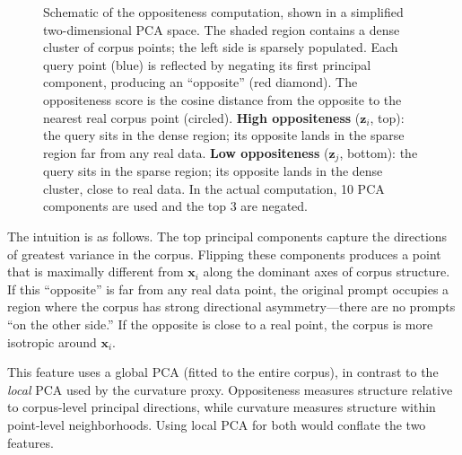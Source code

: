 \begin{figure}[ht]
\caption{Schematic of the oppositeness computation, shown in a simplified two-dimensional PCA space. The shaded region contains a dense cluster of corpus points; the left side is sparsely populated. Each query point (blue) is reflected by negating its first principal component, producing an ``opposite'' (red diamond). The oppositeness score is the cosine distance from the opposite to the nearest real corpus point (circled). \textbf{High oppositeness} ($\mathbf{z}_i$, top): the query sits in the dense region; its opposite lands in the sparse region far from any real data. \textbf{Low oppositeness} ($\mathbf{z}_j$, bottom): the query sits in the sparse region; its opposite lands in the dense cluster, close to real data. In the actual computation, 10 PCA components are used and the top 3 are negated.}
\label{fig:oppositeness}
\end{figure}

The intuition is as follows. The top principal components capture the directions of greatest variance in the corpus. Flipping these components produces a point that is maximally different from $\mathbf{x}_i$ along the dominant axes of corpus structure. If this ``opposite'' is far from any real data point, the original prompt occupies a region where the corpus has strong directional asymmetry---there are no prompts ``on the other side.'' If the opposite is close to a real point, the corpus is more isotropic around $\mathbf{x}_i$.

This feature uses a global PCA (fitted to the entire corpus), in contrast to the \emph{local} PCA used by the curvature proxy. Oppositeness measures structure relative to corpus-level principal directions, while curvature measures structure within point-level neighborhoods. Using local PCA for both would conflate the two features.

